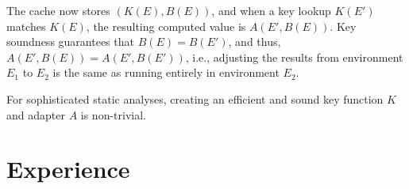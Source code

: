 \documentclass{llncs}
\begin{document}
The cache now stores $(K(E),B(E))$, and when a key lookup $K(E')$
matches $K(E)$, the resulting computed value is $A(E',B(E))$. Key
soundness guarantees that $B(E) = B(E')$, and thus, $A(E', B(E)) =
A(E',B(E'))$, i.e., adjusting the results from environment $E_1$ to
$E_2$ is the same as running entirely in environment $E_2$.






For sophisticated static analyses, creating an efficient and sound key
function $K$ and adapter $A$ is non-trivial.



\section{Experience}
\end{document}
